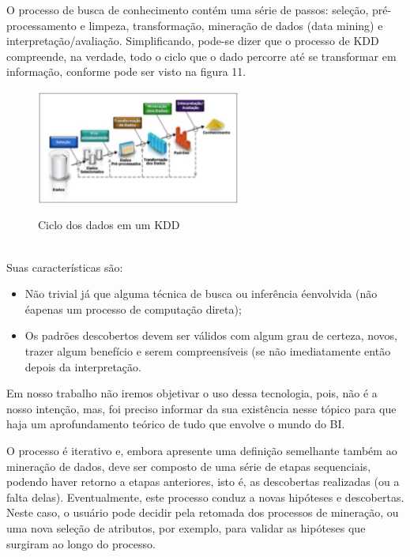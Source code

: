 O processo de busca de conhecimento cont\'{e}m uma s\'{e}rie de passos: sele\c{c}\~{a}o, pr\'{e}-processamento e limpeza, transforma\c{c}\~{a}o, minera\c{c}\~{a}o de dados (data mining) e interpreta\c{c}\~{a}o/avalia\c{c}\~{a}o. 
Simplificando, pode-se dizer que o processo de KDD compreende, na verdade, todo o ciclo que o dado percorre at\'{e} se transformar em informa\c{c}\~{a}o, conforme pode ser visto na figura 11.

\begin{figure}[H]
	\vspace*{0,2cm}
    \centering
    \caption{Ciclo dos dados em um KDD}
    \includegraphics[width=0.6\textwidth]{./04-figuras/figura-11}
    \label{fig:ilustfig11}
\end{figure}
\vspace*{-0,9cm}
{\raggedright {}} \\

Suas caracter\'{i}sticas s\~{a}o:

\begin{itemize}

    \item N\~{a}o trivial j\'{a} que alguma t\'{e}cnica de busca ou inferência \'{e}envolvida (n\~{a}o \'{e}apenas um processo de computa\c{c}\~{a}o direta);
    
    \item Os padr\~{o}es descobertos devem ser v\'{a}lidos com algum grau de certeza, novos, trazer algum benef\'{i}cio e serem compreens\'{i}veis (se n\~{a}o imediatamente ent\~{a}o depois da interpreta\c{c}\~{a}o.

\end{itemize}

Em nosso trabalho n\~{a}o iremos objetivar o uso dessa tecnologia, pois, n\~{a}o \'{e} a nosso inten\c{c}\~{a}o, mas, foi preciso informar da sua exist\^{e}ncia nesse t\'{o}pico para que haja um aprofundamento te\'{o}rico de tudo que envolve o mundo do BI. 

O processo \'{e} iterativo e, embora apresente uma defini\c{c}\~{a}o semelhante tamb\'{e}m ao minera\c{c}\~{a}o de dados, deve ser composto de uma s\'{e}rie de etapas sequenciais, podendo haver retorno a etapas anteriores, isto \'{e}, as descobertas realizadas (ou a falta delas). Eventualmente, este processo conduz a novas hip\'{o}teses e descobertas. Neste caso, o usu\'{a}rio pode decidir pela retomada dos processos de minera\c{c}\~{a}o, ou uma nova sele\c{c}\~{a}o de atributos, por exemplo, para validar as hip\'{o}teses que surgiram ao longo do processo.

